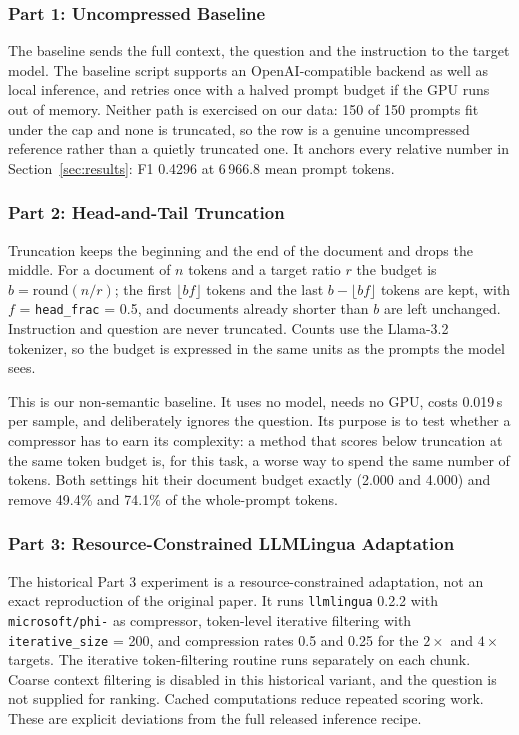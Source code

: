 ﻿\documentclass[10pt,a4paper,twocolumn]{article}
\newcommand{\PhiTwo}{\texttt{microsoft/\allowbreak phi-\allowbreak 2}}
\begin{document}
\subsubsection{Part 1: Uncompressed Baseline}

The baseline sends the full context, the question and the instruction to the
target model. The baseline script supports an OpenAI-compatible backend as well
as local inference, and retries once with a halved prompt budget if the GPU
runs out of memory. Neither path is exercised on our data: 150 of 150 prompts fit
under the cap and none is truncated, so the row is a genuine uncompressed
reference rather than a quietly truncated one. It anchors every relative number in
Section~\ref{sec:results}: F1 0.4296 at 6\,966.8 mean prompt tokens.

\subsubsection{Part 2: Head-and-Tail Truncation}
\label{sec:p2}

Truncation keeps the beginning and the end of the document and drops the middle.
For a document of $n$ tokens and a target ratio $r$ the budget is
$b=\mathrm{round}(n/r)$; the first $\lfloor b f\rfloor$ tokens and the last
$b-\lfloor bf\rfloor$ tokens are kept, with $f$ = \texttt{head\_frac} = 0.5, and
documents already shorter than $b$ are left unchanged. Instruction and question
are never truncated. Counts use the Llama-3.2 tokenizer, so the budget is
expressed in the same units as the prompts the model sees.

This is our non-semantic baseline. It uses no model, needs no GPU, costs 0.019\,s
per sample, and deliberately ignores the question. Its purpose is to test whether
a compressor has to earn its complexity: a method that scores below truncation at
the same token budget is, for this task, a worse way to spend the same number of
tokens. Both settings hit their document budget exactly (2.000 and 4.000) and
remove 49.4\% and 74.1\% of the whole-prompt tokens.

\subsubsection{Part 3: Resource-Constrained LLMLingua Adaptation}
\label{sec:p3}

The historical Part 3 experiment is a resource-constrained adaptation, not an exact reproduction of the original paper. It runs \texttt{llmlingua} 0.2.2 with \PhiTwo{} as compressor,
token-level iterative filtering with \texttt{iterative\_size} = 200, and
compression rates 0.5 and 0.25 for the $2\times$ and $4\times$ targets. The
iterative token-filtering routine runs separately on each chunk. Coarse context filtering is disabled in this historical variant, and the question is not supplied for ranking. Cached computations reduce repeated scoring work. These are explicit deviations from the full released inference recipe.
\end{document}
